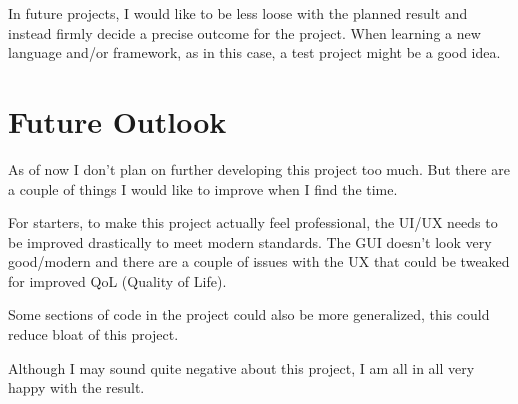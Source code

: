 \documentclass[11pt]{article}
\begin{document}
In future projects, I would like to be less loose with the planned result and
instead firmly decide a precise outcome for the project. When learning a new
language and/or framework, as in this case, a test project might be a good idea.

\section*{Future Outlook}

As of now I don't plan on further developing this project too much. But there are a
couple of things I would like to improve when I find the time.

For starters, to make this project actually feel professional, the UI/UX needs to be improved
drastically to meet modern standards. The GUI doesn't look very good/modern and there
are a couple of issues with the UX that could be tweaked for improved QoL (Quality of Life).

Some sections of code in the project could also be more generalized, this could reduce
bloat of this project.

Although I may sound quite negative about this project, I am all in all very happy with
the result.
\end{document}
